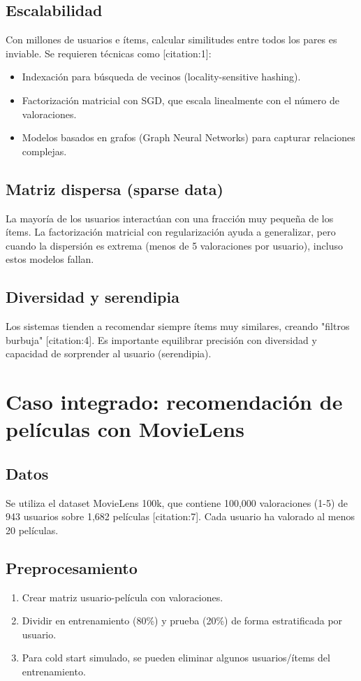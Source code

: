 \documentclass[12pt,a4paper,openany,oneside]{book}
\begin{document}
\subsection{Escalabilidad}
Con millones de usuarios e ítems, calcular similitudes entre todos los pares es inviable. Se requieren técnicas como [citation:1]:
\begin{itemize}
    \item Indexación para búsqueda de vecinos (locality-sensitive hashing).
    \item Factorización matricial con SGD, que escala linealmente con el número de valoraciones.
    \item Modelos basados en grafos (Graph Neural Networks) para capturar relaciones complejas.
\end{itemize}

\subsection{Matriz dispersa (sparse data)}
La mayoría de los usuarios interactúan con una fracción muy pequeña de los ítems. La factorización matricial con regularización ayuda a generalizar, pero cuando la dispersión es extrema (menos de 5 valoraciones por usuario), incluso estos modelos fallan.

\subsection{Diversidad y serendipia}
Los sistemas tienden a recomendar siempre ítems muy similares, creando "filtros burbuja" [citation:4]. Es importante equilibrar precisión con diversidad y capacidad de sorprender al usuario (serendipia).

\section{Caso integrado: recomendación de películas con MovieLens}

\subsection{Datos}
Se utiliza el dataset MovieLens 100k, que contiene 100,000 valoraciones (1-5) de 943 usuarios sobre 1,682 películas [citation:7]. Cada usuario ha valorado al menos 20 películas.

\subsection{Preprocesamiento}
\begin{enumerate}
    \item Crear matriz usuario-película con valoraciones.
    \item Dividir en entrenamiento (80\%) y prueba (20\%) de forma estratificada por usuario.
    \item Para cold start simulado, se pueden eliminar algunos usuarios/ítems del entrenamiento.
\end{enumerate}
\end{document}
